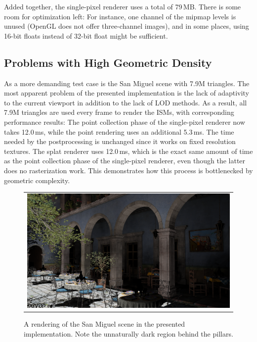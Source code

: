 Added together, the single-pixel renderer uses a total of 79\,MB. There is some room for optimization left: For instance, one channel of the mipmap levels is unused (OpenGL does not offer three-channel images), and in some places, using 16-bit floats instead of 32-bit float might be sufficient.


\subsection{Problems with High Geometric Density}
\label{sec:results:ism:densityProblems}

As a more demanding test case is the San Miguel scene with 7.9M triangles. The most apparent problem of the presented implementation is the lack of adaptivity to the current viewport in addition to the lack of LOD methods. As a result, all 7.9M triangles are used every frame to render the ISMs, with corresponding performance results: The point collection phase of the single-pixel renderer now takes 12.0\,ms, while the point rendering uses an additional 5.3\,ms. The time needed by the postprocessing is unchanged since it works on fixed resolution textures. The splat renderer uses 12.0\,ms, which is the exact same amount of time as the point collection phase of the single-pixel renderer, even though the latter does no rasterization work. This demonstrates how this process is bottlenecked by geometric complexity.


\begin{figure}[htb]
\centering
  \begin{tabular}{@{}c@{}}
    \includegraphics[width=1.0\textwidth]{screenshots/san_miguel_wide} \\
  \end{tabular}
  \caption{A rendering of the San Miguel scene in the presented implementation. Note the unnaturally dark region behind the pillars.}
  \label{fig:results:san_miguel_wide}
\end{figure}

